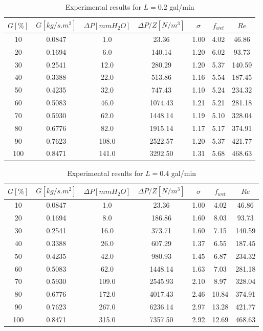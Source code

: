 \begin{table}[H]
    \centering
    \caption{Experimental results for $L=0.2$ gal/min}
    \begin{tabular}{ccccccc}
        \hline
        $G [\%]$ & $G [kg/s.m^2]$ & $\Delta P [mmH_2O]$ & $\Delta P/Z [N/m^3]$ & $\sigma$ & $f_{wet}$ & $Re$ \\
        \hline
        10 & 0.0847 & 1.0 & 23.36 & 1.00 & 4.02 & 46.86 \\
        20 & 0.1694 & 6.0 & 140.14 & 1.20 & 6.02 & 93.73 \\
        30 & 0.2541 & 12.0 & 280.29 & 1.20 & 5.37 & 140.59 \\
        40 & 0.3388 & 22.0 & 513.86 & 1.16 & 5.54 & 187.45 \\
        50 & 0.4235 & 32.0 & 747.43 & 1.10 & 5.24 & 234.32 \\
        60 & 0.5083 & 46.0 & 1074.43 & 1.21 & 5.21 & 281.18 \\
        70 & 0.5930 & 62.0 & 1448.14 & 1.19 & 5.10 & 328.04 \\
        80 & 0.6776 & 82.0 & 1915.14 & 1.17 & 5.17 & 374.91 \\
        90 & 0.7623 & 108.0 & 2522.57 & 1.20 & 5.37 & 421.77 \\
        100 & 0.8471 & 141.0 & 3292.50 & 1.31 & 5.68 & 468.63 \\
        \hline
    \end{tabular}
\end{table}

\begin{table}[H]
    \centering
    \caption{Experimental results for $L=0.4$ gal/min}
    \begin{tabular}{ccccccc}
        \hline
        $G [\%]$ & $G [kg/s.m^2]$ & $\Delta P [mmH_2O]$ & $\Delta P/Z [N/m^3]$ & $\sigma$ & $f_{wet}$ & $Re$ \\
        \hline
        10 & 0.0847 & 1.0 & 23.36 & 1.00 & 4.02 & 46.86 \\
        20 & 0.1694 & 8.0 & 186.86 & 1.60 & 8.03 & 93.73 \\
        30 & 0.2541 & 16.0 & 373.71 & 1.60 & 7.15 & 140.59 \\
        40 & 0.3388 & 26.0 & 607.29 & 1.37 & 6.55 & 187.45 \\
        50 & 0.4235 & 42.0 & 980.93 & 1.45 & 6.87 & 234.32 \\
        60 & 0.5083 & 62.0 & 1448.14 & 1.63 & 7.03 & 281.18 \\
        70 & 0.5930 & 109.0 & 2545.93 & 2.10 & 8.97 & 328.04 \\
        80 & 0.6776 & 172.0 & 4017.43 & 2.46 & 10.84 & 374.91 \\
        90 & 0.7623 & 267.0 & 6236.14 & 2.97 & 13.28 & 421.77 \\
        100 & 0.8471 & 315.0 & 7357.50 & 2.92 & 12.69 & 468.63 \\
        \hline
    \end{tabular}
\end{table}

